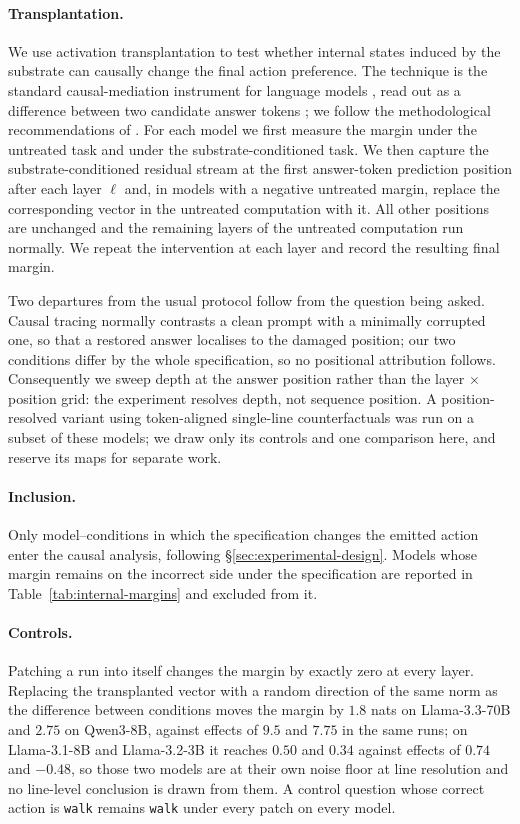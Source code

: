 \paragraph{Transplantation.}
We use activation transplantation to test whether internal states induced by the
substrate can causally change the final action preference. The technique is the
standard causal-mediation instrument for language models
\citep{vig2020causal,meng2022locating}, read out as a difference between two
candidate answer tokens \citep{wang2023interpretability}; we follow the
methodological recommendations of \citet{zhang2024towards}. For each model we first
measure the margin under the untreated task and under the substrate-conditioned
task. We then capture the substrate-conditioned residual stream at the first
answer-token prediction position after each layer $\ell$ and, in models with a
negative untreated margin, replace the corresponding vector in the untreated
computation with it. All other positions are unchanged and the remaining layers of
the untreated computation run normally. We repeat the intervention at each layer and
record the resulting final margin.

Two departures from the usual protocol follow from the question being asked. Causal
tracing normally contrasts a clean prompt with a minimally corrupted one, so that a
restored answer localises to the damaged position; our two conditions differ by the
whole specification, so no positional attribution follows. Consequently we sweep
depth at the answer position rather than the layer $\times$ position grid: the
experiment resolves depth, not sequence position. A position-resolved variant using
token-aligned single-line counterfactuals was run on a subset of these models; we
draw only its controls and one comparison here, and reserve its maps for separate
work.

\paragraph{Inclusion.}
Only model--conditions in which the specification changes the emitted action enter
the causal analysis, following \S\ref{sec:experimental-design}. Models whose margin
remains on the incorrect side under the specification are reported in
Table~\ref{tab:internal-margins} and excluded from it.

\paragraph{Controls.}
Patching a run into itself changes the margin by exactly zero at every layer.
Replacing the transplanted vector with a random direction of the same norm as the
difference between conditions moves the margin by $1.8$ nats on Llama-3.3-70B and
$2.75$ on Qwen3-8B, against effects of $9.5$ and $7.75$ in the same runs; on
Llama-3.1-8B and Llama-3.2-3B it reaches $0.50$ and $0.34$ against effects of $0.74$
and $-0.48$, so those two models are at their own noise floor at line resolution and
no line-level conclusion is drawn from them. A control question whose correct action
is \texttt{walk} remains \texttt{walk} under every patch on every model.

